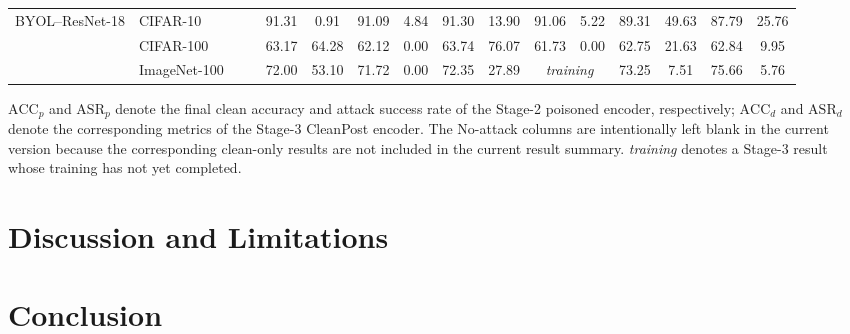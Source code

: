 \documentclass[10pt,journal]{IEEEtran}
\begin{document}
\begin{table}[!t]
{\begin{tabular}{llcc*{12}{c}}
        \midrule

        \multirow{3}{*}{BYOL--ResNet-18}
          & CIFAR-10
          & &
          & 91.31 & 0.91 & 91.09 & 4.84
          & 91.30 & 13.90 & 91.06 & 5.22
          & 89.31 & 49.63 & 87.79 & 25.76 \\
        & CIFAR-100
          & &
          & 63.17 & 64.28 & 62.12 & 0.00
          & 63.74 & 76.07 & 61.73 & 0.00
          & 62.75 & 21.63 & 62.84 & 9.95 \\
        & ImageNet-100
          & &
          & 72.00 & 53.10 & 71.72 & 0.00
          & 72.35 & 27.89
          & \multicolumn{2}{c}{\textit{training}}
          & 73.25 & 7.51 & 75.66 & 5.76 \\

        \bottomrule
    \end{tabular}}
    \vspace{1mm}

    \parbox{\textwidth}{\scriptsize
    $\mathrm{ACC}_{p}$ and $\mathrm{ASR}_{p}$ denote the final clean
    accuracy and attack success rate of the Stage-2 poisoned encoder,
    respectively; $\mathrm{ACC}_{d}$ and $\mathrm{ASR}_{d}$ denote the
    corresponding metrics of the Stage-3 CleanPost encoder. The No-attack
    columns are intentionally left blank in the current version because the
    corresponding clean-only results are not included in the current result
    summary. \textit{training} denotes a Stage-3 result whose training has
    not yet completed.}
\end{table}

\section{Discussion and Limitations}\label{sec:discussion}
\section{Conclusion}\label{sec:conclusion}



\end{document}
